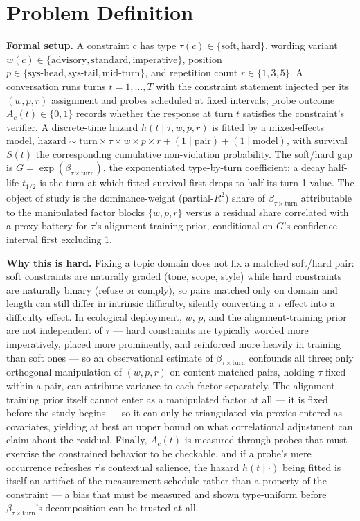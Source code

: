 \documentclass[11pt]{article}
\begin{document}
\section{Problem Definition}

\noindent\textbf{Formal setup.} A constraint $c$ has type $\tau(c) \in \{\text{soft}, \text{hard}\}$, wording variant $w(c) \in \{\text{advisory}, \text{standard}, \text{imperative}\}$, position $p \in \{\text{sys-head}, \text{sys-tail}, \text{mid-turn}\}$, and repetition count $r \in \{1, 3, 5\}$. A conversation runs turns $t = 1,\dots,T$ with the constraint statement injected per its $(w, p, r)$ assignment and probes scheduled at fixed intervals; probe outcome $A_c(t) \in \{0,1\}$ records whether the response at turn $t$ satisfies the constraint's verifier. A discrete-time hazard $h(t \mid \tau, w, p, r)$ is fitted by a mixed-effects model, $\text{hazard} \sim \text{turn} \times \tau \times w \times p \times r + (1\mid\text{pair}) + (1\mid\text{model})$, with survival $S(t)$ the corresponding cumulative non-violation probability. The soft/hard gap is $G = \exp(\beta_{\tau\times\text{turn}})$, the exponentiated type-by-turn coefficient; a decay half-life $t_{1/2}$ is the turn at which fitted survival first drops to half its turn-1 value. The object of study is the dominance-weight (partial-$R^2$) share of $\beta_{\tau\times\text{turn}}$ attributable to the manipulated factor blocks $\{w, p, r\}$ versus a residual share correlated with a proxy battery for $\tau$'s alignment-training prior, conditional on $G$'s confidence interval first excluding 1.

\noindent\textbf{Why this is hard.} Fixing a topic domain does not fix a matched soft/hard pair: soft constraints are naturally graded (tone, scope, style) while hard constraints are naturally binary (refuse or comply), so pairs matched only on domain and length can still differ in intrinsic difficulty, silently converting a $\tau$ effect into a difficulty effect. In ecological deployment, $w$, $p$, and the alignment-training prior are not independent of $\tau$ --- hard constraints are typically worded more imperatively, placed more prominently, and reinforced more heavily in training than soft ones --- so an observational estimate of $\beta_{\tau\times\text{turn}}$ confounds all three; only orthogonal manipulation of $(w, p, r)$ on content-matched pairs, holding $\tau$ fixed within a pair, can attribute variance to each factor separately. The alignment-training prior itself cannot enter as a manipulated factor at all --- it is fixed before the study begins --- so it can only be triangulated via proxies entered as covariates, yielding at best an upper bound on what correlational adjustment can claim about the residual. Finally, $A_c(t)$ is measured through probes that must exercise the constrained behavior to be checkable, and if a probe's mere occurrence refreshes $\tau$'s contextual salience, the hazard $h(t \mid \cdot)$ being fitted is itself an artifact of the measurement schedule rather than a property of the constraint --- a bias that must be measured and shown type-uniform before $\beta_{\tau\times\text{turn}}$'s decomposition can be trusted at all.
\end{document}
